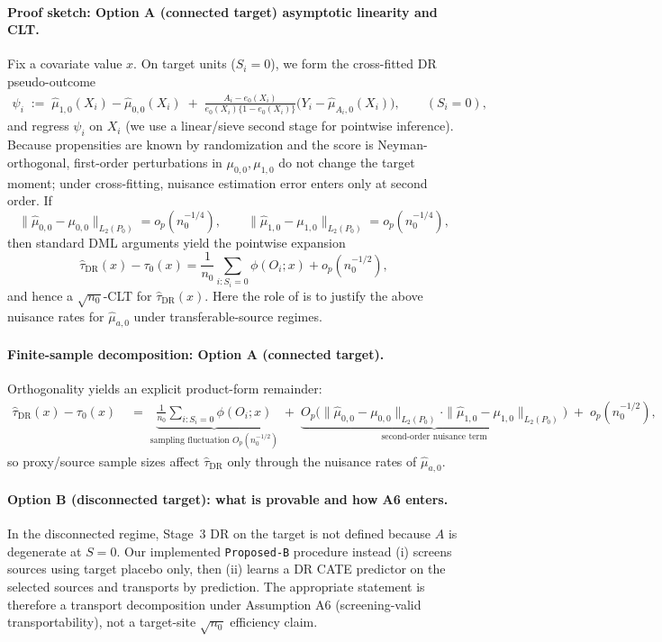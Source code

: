 {\paragraph{Proof sketch: Option A (connected target) asymptotic linearity and CLT.}
Fix a covariate value $x$. On target units ($S_i=0$), we form the cross-fitted DR pseudo-outcome
\begin{align}
\psi_i
\;:=\;
\widehat\mu_{1,0}(X_i)-\widehat\mu_{0,0}(X_i)
\;+\;
\frac{A_i-e_0(X_i)}{e_0(X_i)\{1-e_0(X_i)\}}
\Big(Y_i-\widehat\mu_{A_i,0}(X_i)\Big),
\qquad (S_i=0),
\label{eq:resp_dr_target}
\end{align}
and regress $\psi_i$ on $X_i$ (we use a linear/sieve second stage for pointwise inference). Because propensities are known by randomization and the score is Neyman-orthogonal, first-order perturbations in $\mu_{0,0},\mu_{1,0}$ do not change the target moment; under cross-fitting, nuisance estimation error enters only at second order. If
\[
\|\widehat\mu_{0,0}-\mu_{0,0}\|_{L_2(P_0)}=o_p(n_0^{-1/4}),
\qquad
\|\widehat\mu_{1,0}-\mu_{1,0}\|_{L_2(P_0)}=o_p(n_0^{-1/4}),
\]
then standard DML arguments yield the pointwise expansion
\[
\widehat\tau_{\mathrm{DR}}(x)-\tau_0(x)
=
\frac{1}{n_0}\sum_{i:S_i=0}\phi(O_i;x) + o_p(n_0^{-1/2}),
\]
and hence a $\sqrt{n_0}$-CLT for $\widehat\tau_{\mathrm{DR}}(x)$. Here the role of \cite{tian2023transfer} is to justify the above nuisance rates for $\widehat\mu_{a,0}$ under transferable-source regimes.

\paragraph{Finite-sample decomposition: Option A (connected target).}
Orthogonality yields an explicit product-form remainder:
\begin{align*}
\widehat\tau_{\mathrm{DR}}(x)-\tau_0(x)
\;&=\;
\underbrace{\frac{1}{n_0}\sum_{i:S_i=0}\phi(O_i;x)}_{\text{sampling fluctuation }O_p(n_0^{-1/2})}
\;+\;
\underbrace{O_p\!\Big(
\|\widehat\mu_{0,0}-\mu_{0,0}\|_{L_2(P_0)}\cdot
\|\widehat\mu_{1,0}-\mu_{1,0}\|_{L_2(P_0)}
\Big)}_{\text{second-order nuisance term}}
\;+\; o_p(n_0^{-1/2}),
\end{align*}
so proxy/source sample sizes affect $\widehat\tau_{\mathrm{DR}}$ only through the nuisance rates of $\widehat\mu_{a,0}$.

\paragraph{Option B (disconnected target): what is provable and how A6 enters.}
In the disconnected regime, Stage~3 DR on the target is not defined because $A$ is degenerate at $S=0$. Our implemented \texttt{Proposed-B} procedure instead (i) screens sources using target placebo only, then (ii) learns a DR CATE predictor on the selected sources and transports by prediction. The appropriate statement is therefore a transport decomposition under Assumption A6 (screening-valid transportability), not a target-site $\sqrt{n_0}$ efficiency claim.

}
